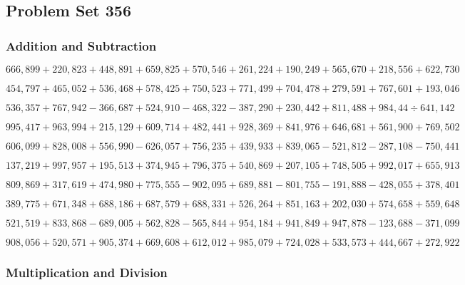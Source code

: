 \hypertarget{problem-set-356}{%
\subsection{Problem Set 356}\label{problem-set-356}}

\hypertarget{addition-and-subtraction}{%
\subsubsection{Addition and
Subtraction}\label{addition-and-subtraction}}

\(666,899+220,823+448,891+659,825+570,546+261,224+190,249+565,670+218,556+622,730\)

\(454,797+465,052+536,468+578,425+750,523+771,499+704,478+279,591+767,601+193,046\)

\(536,357+767,942-366,687+524,910-468,322-387,290+230,442+811,488+984,44÷641,142\)

\(995,417+963,994+215,129+609,714+482,441+928,369+841,976+646,681+561,900+769,502\)

\(606,099+828,008+556,990-626,057+756,235+439,933+839,065-521,812-287,108-750,441\)

\(137,219+997,957+195,513+374,945+796,375+540,869+207,105+748,505+992,017+655,913\)

\(809,869+317,619+474,980+775,555-902,095+689,881-801,755-191,888-428,055+378,401\)

\(389,775+671,348+688,186+687,579+688,331+526,264+851,163+202,030+574,658+559,648\)

\(521,519+833,868-689,005+562,828-565,844+954,184+941,849+947,878-123,688-371,099\)

\(908,056+520,571+905,374+669,608+612,012+985,079+724,028+533,573+444,667+272,922\)

\hypertarget{multiplication-and-division}{%
\subsubsection{Multiplication and
Division}\label{multiplication-and-division}}

